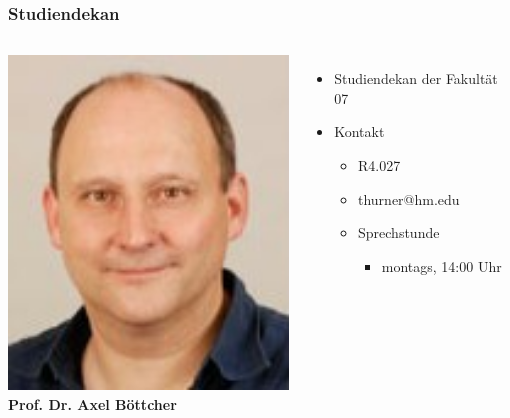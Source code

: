 \documentclass{beamer}
\begin{document}
    \begin{frame} %
    	\frametitle{Studiendekan}
    	\begin{columns}
    		\includegraphics[width=1.0\textwidth]{boettcher.jpg}
    		\textbf{Prof. Dr. Axel Böttcher}
    		\begin{itemize}
    			\item Studiendekan der Fakultät 07
    			\bigskip
    			\item Kontakt
    			\begin{itemize}
    				\item R4.027
    				\item thurner@hm.edu
    				\item Sprechstunde
    				\begin{itemize}
    					\item montags, 14:00 Uhr
    				\end{itemize}
    			\end{itemize}
    		\end{itemize}
    	\end{columns}
    \end{frame}
    
\end{document}

